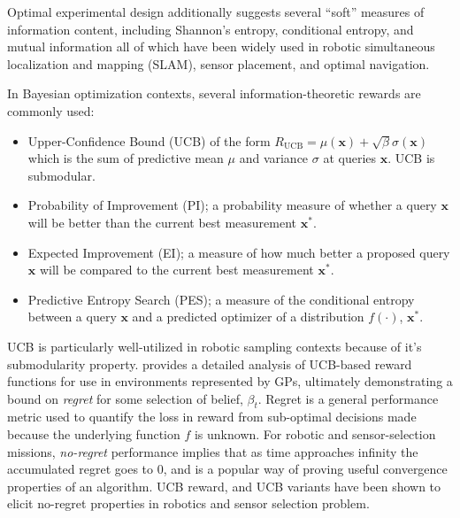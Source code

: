 Optimal experimental design additionally suggests several ``soft'' measures of information content, including Shannon's entropy\autocite{shannon1998mathematical}, conditional entropy, and mutual information all of which have been widely used in robotic simultaneous localization and mapping (SLAM)\autocite{burgard1997active, carrillo2015autonomous, bourgault2002information, valencia2018active}, sensor placement\autocite{guestrin2005near, papadimitriou2000entropy, Krause2008}, and optimal navigation\autocite{daniel2012hierarchical}.

In Bayesian optimization contexts, several information-theoretic rewards are commonly used:

\begin{itemize}
    \item Upper-Confidence Bound (UCB)\autocite{agrawal1995sample,auer2002using,snoek2012practical} of the form $R_{\text{UCB}} = \mu(\mathbf{x}) + \sqrt{\beta}\sigma(\mathbf{x})$ which is the sum of predictive mean $\mu$ and variance $\sigma$ at queries $\mathbf{x}$. UCB is submodular\autocite{nemhauser1978analysis}.
    \item Probability of Improvement (PI)\autocite{snoek2012practical,kushner1964new}; a probability measure of whether a query $\mathbf{x}$ will be better than the current best measurement $\mathbf{x}^*$.
    \item Expected Improvement (EI)\autocite{snoek2012practical,jones1998efficient}; a measure of how much better a proposed query $\mathbf{x}$ will be compared to the current best measurement $\mathbf{x}^*$.
    \item Predictive Entropy Search (PES)\autocite{hennig2012entropy,hernandez2014predictive}; a measure of the conditional entropy between a query $\mathbf{x}$ and a predicted optimizer of a distribution $f(\cdot)$, $\mathbf{x}^*$.
\end{itemize} 

UCB is particularly well-utilized in robotic sampling contexts because of it's submodularity property.
\cite{Srinivas2012} provides a detailed analysis of UCB-based reward functions for use in environments represented by GPs, ultimately demonstrating a bound on \emph{regret} for some selection of belief, $\beta_t$.
Regret is a general performance metric used to quantify the loss in reward from sub-optimal decisions made because the underlying function $f$ is unknown.
For robotic and sensor-selection missions, \emph{no-regret} performance implies that as time approaches infinity the accumulated regret goes to 0, and is a popular way of proving useful convergence properties of an algorithm.
UCB reward, and UCB variants have been shown to elicit no-regret properties in robotics and sensor selection problem\autocite{Sun2017,Srinivas2012,garivier2011kl}.


